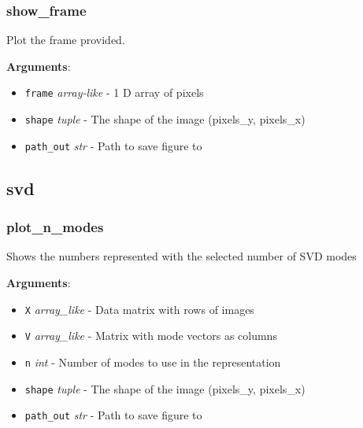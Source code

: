 \subsubsection{show\_frame}

\begin{Shaded}
\begin{Highlighting}[]
\end{Highlighting}
\end{Shaded}

Plot the frame provided.

\textbf{Arguments}:

\begin{itemize}
\tightlist
\item
  \texttt{frame} \emph{array-like} - 1 D array of pixels
\item
  \texttt{shape} \emph{tuple} - The shape of the image (pixels\_y,
  pixels\_x)
\item
  \texttt{path\_out} \emph{str} - Path to save figure to
\end{itemize}

\subsection{svd}

\subsubsection{plot\_n\_modes}

\begin{Shaded}
\begin{Highlighting}[]
\end{Highlighting}
\end{Shaded}

Shows the numbers represented with the selected number of SVD modes

\textbf{Arguments}:

\begin{itemize}
\tightlist
\item
  \texttt{X} \emph{array\_like} - Data matrix with rows of images
\item
  \texttt{V} \emph{array\_like} - Matrix with mode vectors as columns
\item
  \texttt{n} \emph{int} - Number of modes to use in the representation
\item
  \texttt{shape} \emph{tuple} - The shape of the image (pixels\_y,
  pixels\_x)
\item
  \texttt{path\_out} \emph{str} - Path to save figure to
\end{itemize}

